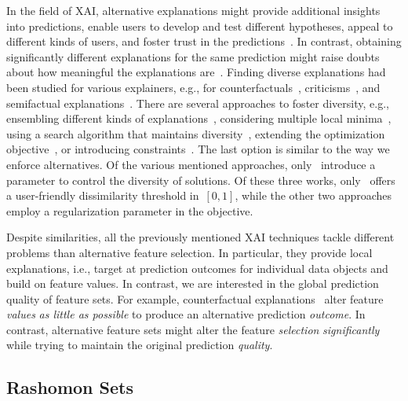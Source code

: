\documentclass{article}
\theoremstyle{definition}
\begin{document}
In the field of XAI, alternative explanations might provide additional insights into predictions, enable users to develop and test different hypotheses, appeal to different kinds of users, and foster trust in the predictions~\cite{kim2021multi, wang2019designing}.
In contrast, obtaining significantly different explanations for the same prediction might raise doubts about how meaningful the explanations are~\cite{jain2019attention}.
Finding diverse explanations had been studied for various explainers, e.g., for counterfactuals~\cite{dandl2020multi, karimi2020model, mohammadi2021scaling, mothilal2020explaining, russell2019efficient, wachter2017counterfactual}, criticisms~\cite{kim2016examples}, and semifactual explanations~\cite{artelt2022even}.
There are several approaches to foster diversity, e.g., ensembling different kinds of explanations~\cite{silva2019produce}, considering multiple local minima~\cite{wachter2017counterfactual}, using a search algorithm that maintains diversity~\cite{dandl2020multi}, extending the optimization objective~\cite{artelt2022even, kim2016examples, mothilal2020explaining}, or introducing constraints~\cite{karimi2020model, mohammadi2021scaling, russell2019efficient}.
The last option is similar to the way we enforce alternatives.
Of the various mentioned approaches, only~\cite{artelt2022even, mohammadi2021scaling, mothilal2020explaining} introduce a parameter to control the diversity of solutions.
Of these three works, only~\cite{mohammadi2021scaling} offers a user-friendly dissimilarity threshold in~$[0,1]$, while the other two approaches employ a regularization parameter in the objective.

Despite similarities, all the previously mentioned XAI techniques tackle different problems than alternative feature selection.
In particular, they provide local explanations, i.e., target at prediction outcomes for individual data objects and build on feature values.
In contrast, we are interested in the global prediction quality of feature sets.
For example, counterfactual explanations~\cite{guidotti2022counterfactual, stepin2021survey, verma2020counterfactual} alter feature \emph{values} \emph{as little as possible} to produce an alternative prediction \emph{outcome}.
In contrast, alternative feature sets might alter the feature \emph{selection} \emph{significantly} while trying to maintain the original prediction \emph{quality}.

\subsection{Rashomon Sets}
\label{sec:afs-related-work:rashomon-sets}
\end{document}
